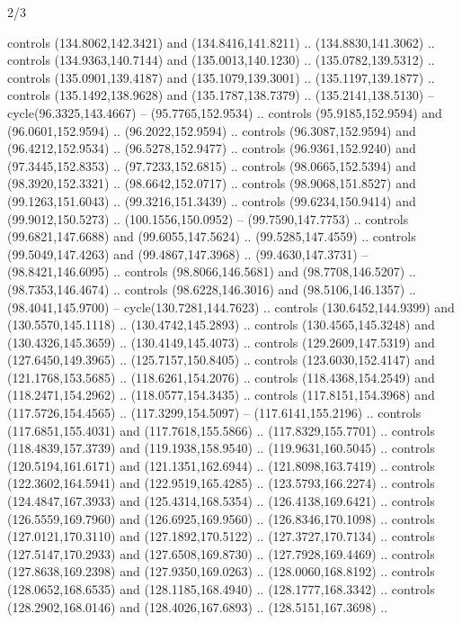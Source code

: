 \begin{flagdescription}{2/3}
\begin{scope}[shift={(0.5\flaglength,0.5)},scale=\flagwidth/320]
\begin{scope}[y=0.8pt, x=0.8pt, yscale=-1,shift={(-118.3,-146)}]
  controls (134.8062,142.3421) and (134.8416,141.8211) .. (134.8830,141.3062) ..
  controls (134.9363,140.7144) and (135.0013,140.1230) .. (135.0782,139.5312) ..
  controls (135.0901,139.4187) and (135.1079,139.3001) .. (135.1197,139.1877) ..
  controls (135.1492,138.9628) and (135.1787,138.7379) .. (135.2141,138.5130) --
  cycle(96.3325,143.4667) -- (95.7765,152.9534) .. controls (95.9185,152.9594)
  and (96.0601,152.9594) .. (96.2022,152.9594) .. controls (96.3087,152.9594)
  and (96.4212,152.9534) .. (96.5278,152.9477) .. controls (96.9361,152.9240)
  and (97.3445,152.8353) .. (97.7233,152.6815) .. controls (98.0665,152.5394)
  and (98.3920,152.3321) .. (98.6642,152.0717) .. controls (98.9068,151.8527)
  and (99.1263,151.6043) .. (99.3216,151.3439) .. controls (99.6234,150.9414)
  and (99.9012,150.5273) .. (100.1556,150.0952) -- (99.7590,147.7753) ..
  controls (99.6821,147.6688) and (99.6055,147.5624) .. (99.5285,147.4559) ..
  controls (99.5049,147.4263) and (99.4867,147.3968) .. (99.4630,147.3731) --
  (98.8421,146.6095) .. controls (98.8066,146.5681) and (98.7708,146.5207) ..
  (98.7353,146.4674) .. controls (98.6228,146.3016) and (98.5106,146.1357) ..
  (98.4041,145.9700) -- cycle(130.7281,144.7623) .. controls (130.6452,144.9399)
  and (130.5570,145.1118) .. (130.4742,145.2893) .. controls (130.4565,145.3248)
  and (130.4326,145.3659) .. (130.4149,145.4073) .. controls (129.2609,147.5319)
  and (127.6450,149.3965) .. (125.7157,150.8405) .. controls (123.6030,152.4147)
  and (121.1768,153.5685) .. (118.6261,154.2076) .. controls (118.4368,154.2549)
  and (118.2471,154.2962) .. (118.0577,154.3435) .. controls (117.8151,154.3968)
  and (117.5726,154.4565) .. (117.3299,154.5097) -- (117.6141,155.2196) ..
  controls (117.6851,155.4031) and (117.7618,155.5866) .. (117.8329,155.7701) ..
  controls (118.4839,157.3739) and (119.1938,158.9540) .. (119.9631,160.5045) ..
  controls (120.5194,161.6171) and (121.1351,162.6944) .. (121.8098,163.7419) ..
  controls (122.3602,164.5941) and (122.9519,165.4285) .. (123.5793,166.2274) ..
  controls (124.4847,167.3933) and (125.4314,168.5354) .. (126.4138,169.6421) ..
  controls (126.5559,169.7960) and (126.6925,169.9560) .. (126.8346,170.1098) ..
  controls (127.0121,170.3110) and (127.1892,170.5122) .. (127.3727,170.7134) ..
  controls (127.5147,170.2933) and (127.6508,169.8730) .. (127.7928,169.4469) ..
  controls (127.8638,169.2398) and (127.9350,169.0263) .. (128.0060,168.8192) ..
  controls (128.0652,168.6535) and (128.1185,168.4940) .. (128.1777,168.3342) ..
  controls (128.2902,168.0146) and (128.4026,167.6893) .. (128.5151,167.3698) ..

\end{scope}
\end{scope}
\end{flagdescription}
